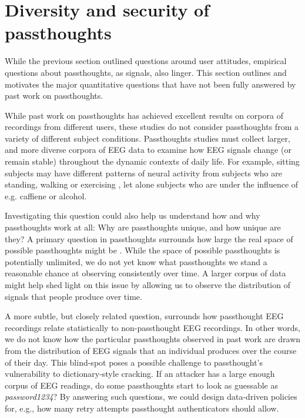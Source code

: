 \documentclass[sigconf]{acmart}
\begin{document}
\section{Diversity and security of passthoughts}
\label{sec:orga4f01a7}

While the previous section outlined questions around user attitudes, empirical questions about passthoughts, as signals, also linger.
This section outlines and motivates the major quantitative questions that have not been fully answered by past work on passthoughts.

While past work on passthoughts has achieved excellent results on corpora of recordings from different users, 
these studies do not consider passthoughts from a variety of different subject conditions.
Passthoughts studies must collect larger, and more diverse corpora of EEG data to examine how EEG signals change (or remain stable) throughout the dynamic contexts of daily life.
For example, sitting subjects may have different patterns of neural activity from subjects who are standing, walking or exercising \cite{Thibault2016a},
let alone subjects who are under the influence of e.g. caffiene or alcohol.

Investigating this question could also help us understand how and why passthoughts work at all: Why are passthoughts unique, and how unique are they?
A primary question in passthoughts surrounds how large the real space of possible passthoughts might be \cite{Thorpe2005}.
While the space of possible passthoughts is potentially unlimited, we do not yet know what passthoughts we stand a reasonable chance at observing consistently over time.
A larger corpus of data might help shed light on this issue by allowing us to observe the distribution of signals that people produce over time.

A more subtle, but closely related question, surrounds how passthought EEG recordings relate statistically to non-passthought EEG recordings.
In other words, we do not know how the particular passthoughts observed in past work are drawn from the distribution of EEG signals that an individual produces over the course of their day.
This blind-spot poses a possible challenge to passthought's vulnerability to dictionary-style cracking.
If an attacker has a large enough corpus of EEG readings, do some passthoughts start to look as guessable as \emph{password1234}?
By answering such questions, we could design data-driven policies for, e.g., how many retry attempts passthought authenticators should allow.
\end{document}
